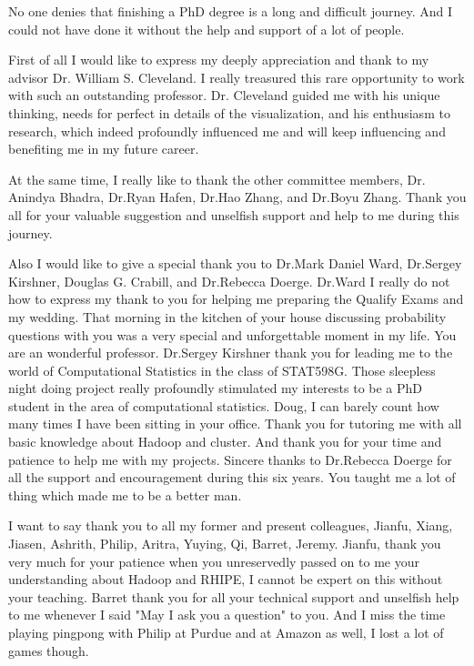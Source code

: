 \begin{acknowledgments}

No one denies that finishing a PhD degree is a long and difficult journey. And I 
could not have done it without the help and support of a lot of people.

First of all I would like to express my deeply appreciation and thank to my 
advisor Dr. William S. Cleveland. I really treasured this rare opportunity to 
work with such an outstanding professor. Dr. Cleveland guided me with his unique 
thinking, needs for perfect in details of the visualization, and his enthusiasm 
to research, which indeed profoundly influenced me and will keep influencing and
benefiting me in my future career.

At the same time, I really like to thank the other committee members, Dr. Anindya 
Bhadra, Dr.Ryan Hafen, Dr.Hao Zhang, and Dr.Boyu Zhang. Thank you all for your 
valuable suggestion and unselfish support and help to me during this journey.

Also I would like to give a special thank you to Dr.Mark Daniel Ward, Dr.Sergey
Kirshner, Douglas G. Crabill, and Dr.Rebecca Doerge. Dr.Ward I really do not how 
to express my thank to you for helping me preparing the Qualify Exams and my 
wedding. That morning in the kitchen of your house discussing probability questions 
with you was a very special and unforgettable moment in my life. You are an 
wonderful professor. Dr.Sergey Kirshner thank you for leading me to the world of 
Computational Statistics in the class of STAT598G. Those sleepless night doing 
project really profoundly stimulated my interests to be a PhD student in the area 
of computational statistics. Doug, I can barely count how many times I have been
sitting in your office. Thank you for tutoring me with all basic 
knowledge about Hadoop and cluster. And thank you for your time and patience to 
help me with my projects. Sincere thanks to Dr.Rebecca Doerge for all the support 
and encouragement during this six years. You taught me a lot of thing which made 
me to be a better man.

I want to say thank you to all my former and present colleagues, Jianfu, Xiang, 
Jiasen, Ashrith, Philip, Aritra, Yuying, Qi, Barret, Jeremy. Jianfu, thank you 
very much for your patience when you unreservedly passed on to me your 
understanding about Hadoop and RHIPE, I cannot be expert on this without your 
teaching. Barret thank you for all your technical support and unselfish help to 
me whenever I said "May I ask you a question" to you. And I miss the time playing
pingpong with Philip at Purdue and at Amazon as well, I lost a lot of games though.


\end{acknowledgments}
